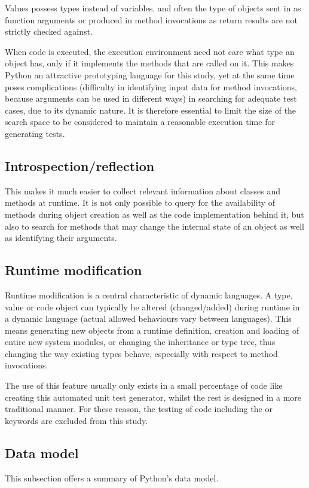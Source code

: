 \documentclass{icldt}
\numberwithin{equation}{section}       %
\begin{document}
{Values possess types instead of variables, and often the type of objects sent in as function arguments or produced in method invocations as return results are not strictly checked against.

When code is executed, the execution environment need not care what type an object has, only if it implements the methods that are called on it. This makes Python an attractive prototyping language for this study, yet at the same time poses complications (difficulty in identifying input data for method invocations, because arguments can be used in different ways) in searching for adequate test cases, due to its dynamic nature. It is therefore essential to limit the size of the search space to be considered to maintain a reasonable execution time for generating tests.

\subsection{Introspection/reflection}
This makes it much easier to collect relevant information about classes and methods at runtime. It is not only possible to query for the availability of methods during object creation as well as the code implementation behind it, but also to search for methods that may change the internal state of an object as well as identifying their arguments.

\subsection{Runtime modification}
Runtime modification is a central characteristic of dynamic languages. A type, value or code object can typically be altered (changed/added) during runtime in a dynamic language (actual allowed behaviours vary between languages). This means generating new objects from a runtime definition, creation and loading of entire new system modules, or changing the inheritance or type tree, thus changing the way existing types behave, especially with respect to method invocations.

The use of this feature usually only exists in a small percentage of code like creating this automated unit test generator, whilst the rest is designed in a more traditional manner. For these reason, the testing of code including the  or  keywords are excluded from this study.

\subsection{Data model}
This subsection offers a summary of Python's data model.

}
\end{document}
